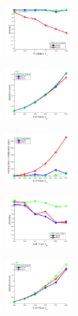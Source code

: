 \documentclass[hyperref={pdfpagelabels=false}]{beamer}
\begin{document}
\begin{frame}[allowframebreaks]
\begin{figure}[h] 
		\begin{subfigure}[b]{0.32\textwidth}
			\centering
			\includegraphics[width=2.5cm]{"fig/evaluation/SyntheticTest_BigGraphs/descr/Results_v4.3.3/Test1/accuracy_avg1t"} 
		\end{subfigure}
		\begin{subfigure}[b]{0.32\textwidth}
			\centering
			\includegraphics[width=2.5cm]{"fig/evaluation/SyntheticTest_BigGraphs/descr/Results_v4.3.3/Test1/score_avg1t"} 
		\end{subfigure} 
		\begin{subfigure}[b]{0.32\textwidth}
			\centering
			\includegraphics[width=2.5cm]{"fig/evaluation/SyntheticTest_BigGraphs/descr/Results_v4.3.3/Test1/time_summary_avg1t"} 
		\end{subfigure} 	
\end{figure}
\vspace{-20pt}
\begin{figure}[h] 
		\begin{subfigure}[b]{0.32\textwidth}
			\centering
			\includegraphics[width=2.5cm]{"fig/evaluation/SyntheticTest_BigGraphs/descr/Results_v4.3.3/Test2/accuracy_avg1t"} 
		\end{subfigure}
		\begin{subfigure}[b]{0.32\textwidth}
			\centering
			\includegraphics[width=2.5cm]{"fig/evaluation/SyntheticTest_BigGraphs/descr/Results_v4.3.3/Test2/score_avg1t"} 

\end{subfigure}
\end{figure}
\end{frame}
\end{document}
